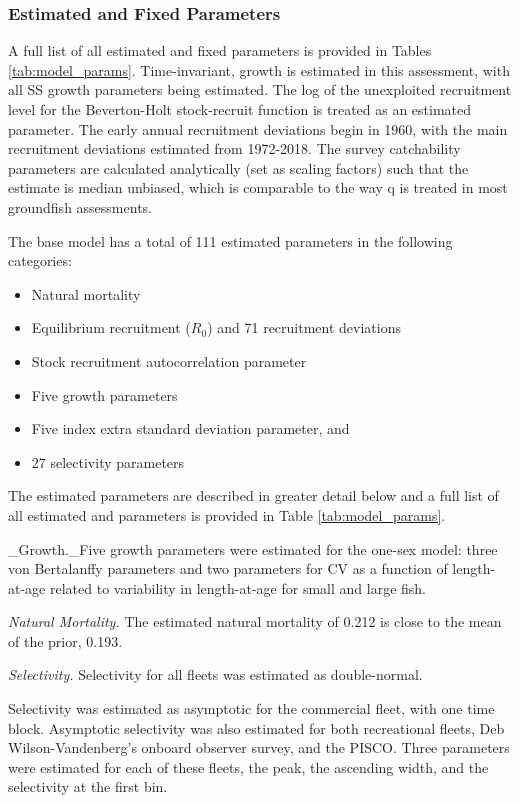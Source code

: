 \documentclass[12pt,]{article}
\begin{document}
\subsubsection{Estimated and Fixed
Parameters}\label{estimated-and-fixed-parameters}

A full list of all estimated and fixed parameters is provided in Tables
\ref{tab:model_params}. Time-invariant, growth is estimated in this
assessment, with all SS growth parameters being estimated. The log of
the unexploited recruitment level for the Beverton-Holt stock-recruit
function is treated as an estimated parameter. The early annual
recruitment deviations begin in 1960, with the main recruitment
deviations estimated from 1972-2018. The survey catchability parameters
are calculated analytically (set as scaling factors) such that the
estimate is median unbiased, which is comparable to the way q is treated
in most groundfish assessments.

The base model has a total of 111 estimated parameters in the following
categories:

\begin{itemize}
  \item Natural mortality
  \item Equilibrium recruitment ($R_0$) and 71 recruitment deviations
  \item Stock recruitment autocorrelation parameter
  \item Five growth parameters
  \item Five index extra standard deviation parameter, and
  \item 27 selectivity parameters
\end{itemize}

The estimated parameters are described in greater detail below and a
full list of all estimated and parameters is provided in Table
\ref{tab:model_params}.

\_Growth.\_Five growth parameters were estimated for the one-sex model:
three von Bertalanffy parameters and two parameters for CV as a function
of length-at-age related to variability in length-at-age for small and
large fish.

\emph{Natural Mortality.} The estimated natural mortality of 0.212 is
close to the mean of the prior, 0.193.

\emph{Selectivity.} Selectivity for all fleets was estimated as
double-normal.

Selectivity was estimated as asymptotic for the commercial fleet, with
one time block. Asymptotic selectivity was also estimated for both
recreational fleets, Deb Wilson-Vandenberg's onboard observer survey,
and the PISCO. Three parameters were estimated for each of these fleets,
the peak, the ascending width, and the selectivity at the first bin.
\end{document}
